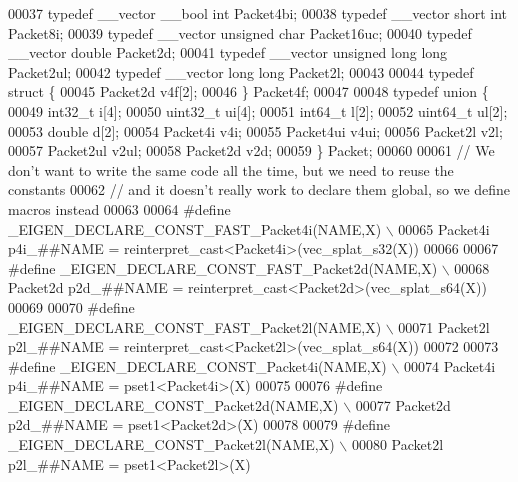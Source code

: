 \begin{DoxyCode}
00037 \textcolor{keyword}{typedef} \_\_vector \_\_bool \textcolor{keywordtype}{int}          Packet4bi;
00038 \textcolor{keyword}{typedef} \_\_vector \textcolor{keywordtype}{short} \textcolor{keywordtype}{int}           Packet8i;
00039 \textcolor{keyword}{typedef} \_\_vector \textcolor{keywordtype}{unsigned} \textcolor{keywordtype}{char}       Packet16uc;
00040 \textcolor{keyword}{typedef} \_\_vector \textcolor{keywordtype}{double}              Packet2d;
00041 \textcolor{keyword}{typedef} \_\_vector \textcolor{keywordtype}{unsigned} \textcolor{keywordtype}{long} \textcolor{keywordtype}{long}  Packet2ul;
00042 \textcolor{keyword}{typedef} \_\_vector \textcolor{keywordtype}{long} \textcolor{keywordtype}{long}           Packet2l;
00043 
00044 \textcolor{keyword}{typedef} \textcolor{keyword}{struct }\{
00045     Packet2d  v4f[2];
00046 \} Packet4f;
00047 
00048 \textcolor{keyword}{typedef} \textcolor{keyword}{union }\{
00049   int32\_t   i[4];
00050   uint32\_t ui[4];
00051   int64\_t   l[2];
00052   uint64\_t ul[2];
00053   \textcolor{keywordtype}{double}    d[2];
00054   Packet4i  v4i;
00055   Packet4ui v4ui;
00056   Packet2l  v2l;
00057   Packet2ul v2ul;
00058   Packet2d  v2d;
00059 \} Packet;
00060 
00061 \textcolor{comment}{// We don't want to write the same code all the time, but we need to reuse the constants}
00062 \textcolor{comment}{// and it doesn't really work to declare them global, so we define macros instead}
00063 
00064 \textcolor{preprocessor}{#define \_EIGEN\_DECLARE\_CONST\_FAST\_Packet4i(NAME,X) \(\backslash\)}
00065 \textcolor{preprocessor}{  Packet4i p4i\_##NAME = reinterpret\_cast<Packet4i>(vec\_splat\_s32(X))}
00066 
00067 \textcolor{preprocessor}{#define \_EIGEN\_DECLARE\_CONST\_FAST\_Packet2d(NAME,X) \(\backslash\)}
00068 \textcolor{preprocessor}{  Packet2d p2d\_##NAME = reinterpret\_cast<Packet2d>(vec\_splat\_s64(X))}
00069 
00070 \textcolor{preprocessor}{#define \_EIGEN\_DECLARE\_CONST\_FAST\_Packet2l(NAME,X) \(\backslash\)}
00071 \textcolor{preprocessor}{  Packet2l p2l\_##NAME = reinterpret\_cast<Packet2l>(vec\_splat\_s64(X))}
00072 
00073 \textcolor{preprocessor}{#define \_EIGEN\_DECLARE\_CONST\_Packet4i(NAME,X) \(\backslash\)}
00074 \textcolor{preprocessor}{  Packet4i p4i\_##NAME = pset1<Packet4i>(X)}
00075 
00076 \textcolor{preprocessor}{#define \_EIGEN\_DECLARE\_CONST\_Packet2d(NAME,X) \(\backslash\)}
00077 \textcolor{preprocessor}{  Packet2d p2d\_##NAME = pset1<Packet2d>(X)}
00078 
00079 \textcolor{preprocessor}{#define \_EIGEN\_DECLARE\_CONST\_Packet2l(NAME,X) \(\backslash\)}
00080 \textcolor{preprocessor}{  Packet2l p2l\_##NAME = pset1<Packet2l>(X)}

\end{DoxyCode}

